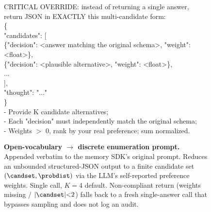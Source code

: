 \begin{figure}[t]
\centering
\begin{tcbox}[colback=gray!4, colframe=black!50, fontupper=\ttfamily\scriptsize, width=0.97\linewidth, boxsep=2pt, left=2pt, right=2pt, top=2pt, bottom=2pt]
CRITICAL OVERRIDE: instead of returning a single answer, return JSON in EXACTLY this multi-candidate form:\\[2pt]
\{\\
\hspace*{1em}"candidates": [\\
\hspace*{2em}\{"decision": <answer matching the original schema>, "weight": <float>\},\\
\hspace*{2em}\{"decision": <plausible alternative>, "weight": <float>\},\\
\hspace*{2em}...\\
\hspace*{1em}],\\
\hspace*{1em}"thought": "..."\\
\}\\[2pt]
- Provide K candidate alternatives;\\
- Each "decision" must independently match the original schema;\\
- Weights $>$ 0, rank by your real preference; sum normalized.
\end{tcbox}
\caption{\textbf{Open-vocabulary $\to$ discrete enumeration prompt.}
Appended verbatim to the memory SDK's original prompt.  Reduces an
unbounded structured-JSON output to a finite candidate set
$(\candset, \probdist)$ via the LLM's self-reported preference
weights. Single call, $K{=}4$ default. Non-compliant return
(weights missing / $|\candset|{<}2$) falls back to a fresh
single-answer call that bypasses sampling and does not log an audit.}
\label{fig:prompt-template}
\end{figure}
